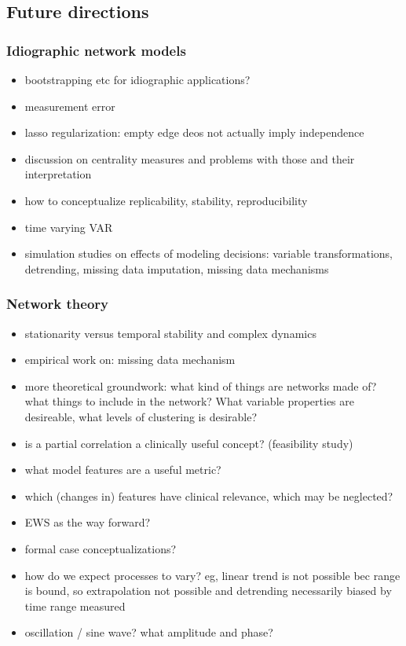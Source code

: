\documentclass[
  english,
  man]{apa6}
\providecommand{\tightlist}{%
  \setlength{\itemsep}{0pt}\setlength{\parskip}{0pt}}
\begin{document}
\hypertarget{future-directions}{%
\subsection{Future directions}\label{future-directions}}

\hypertarget{idiographic-network-models}{%
\subsubsection{Idiographic network models}\label{idiographic-network-models}}

\begin{itemize}
\tightlist
\item
  bootstrapping etc for idiographic applications?
\item
  measurement error
\item
  lasso regularization: empty edge deos not actually imply independence
\item
  discussion on centrality measures and problems with those and their interpretation
\item
  how to conceptualize replicability, stability, reproducibility
\item
  time varying VAR
\item
  simulation studies on effects of modeling decisions: variable transformations, detrending, missing data imputation, missing data mechanisms
\end{itemize}

\hypertarget{network-theory}{%
\subsubsection{Network theory}\label{network-theory}}

\begin{itemize}
\tightlist
\item
  stationarity versus temporal stability and complex dynamics
\item
  empirical work on: missing data mechanism
\item
  more theoretical groundwork: what kind of things are networks made of? what things to include in the network? What variable properties are desireable, what levels of clustering is desirable?
\item
  is a partial correlation a clinically useful concept? (feasibility study)
\item
  what model features are a useful metric?
\item
  which (changes in) features have clinical relevance, which may be neglected?
\item
  EWS as the way forward?
\item
  formal case conceptualizations?
\item
  how do we expect processes to vary? eg, linear trend is not possible bec range is bound, so extrapolation not possible and detrending necessarily biased by time range measured
\item
  oscillation / sine wave? what amplitude and phase?
\end{itemize}
\end{document}

